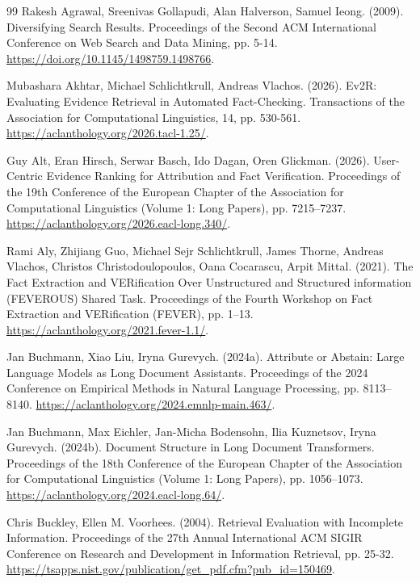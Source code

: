 \documentclass[twoside,a4paper,11pt]{article}
\begin{document}
\clearpage\begin{thebibliography}{99}
Rakesh Agrawal, Sreenivas Gollapudi, Alan Halverson, Samuel Ieong. (2009). Diversifying Search Results. Proceedings of the Second ACM International Conference on Web Search and Data Mining, pp. 5-14. \url{https://doi.org/10.1145/1498759.1498766}.

Mubashara Akhtar, Michael Schlichtkrull, Andreas Vlachos. (2026). Ev2R: Evaluating Evidence Retrieval in Automated Fact-Checking. Transactions of the Association for Computational Linguistics, 14, pp. 530-561. \url{https://aclanthology.org/2026.tacl-1.25/}.

Guy Alt, Eran Hirsch, Serwar Basch, Ido Dagan, Oren Glickman. (2026). User-Centric Evidence Ranking for Attribution and Fact Verification. Proceedings of the 19th Conference of the European Chapter of the Association for Computational Linguistics (Volume 1: Long Papers), pp. 7215--7237. \url{https://aclanthology.org/2026.eacl-long.340/}.

Rami Aly, Zhijiang Guo, Michael Sejr Schlichtkrull, James Thorne, Andreas Vlachos, Christos Christodoulopoulos, Oana Cocarascu, Arpit Mittal. (2021). The Fact Extraction and VERification Over Unstructured and Structured information (FEVEROUS) Shared Task. Proceedings of the Fourth Workshop on Fact Extraction and VERification (FEVER), pp. 1--13. \url{https://aclanthology.org/2021.fever-1.1/}.

Jan Buchmann, Xiao Liu, Iryna Gurevych. (2024a). Attribute or Abstain: Large Language Models as Long Document Assistants. Proceedings of the 2024 Conference on Empirical Methods in Natural Language Processing, pp. 8113--8140. \url{https://aclanthology.org/2024.emnlp-main.463/}.

Jan Buchmann, Max Eichler, Jan-Micha Bodensohn, Ilia Kuznetsov, Iryna Gurevych. (2024b). Document Structure in Long Document Transformers. Proceedings of the 18th Conference of the European Chapter of the Association for Computational Linguistics (Volume 1: Long Papers), pp. 1056--1073. \url{https://aclanthology.org/2024.eacl-long.64/}.

Chris Buckley, Ellen M. Voorhees. (2004). Retrieval Evaluation with Incomplete Information. Proceedings of the 27th Annual International ACM SIGIR Conference on Research and Development in Information Retrieval, pp. 25-32. \url{https://tsapps.nist.gov/publication/get_pdf.cfm?pub_id=150469}.


\end{thebibliography}
\end{document}
